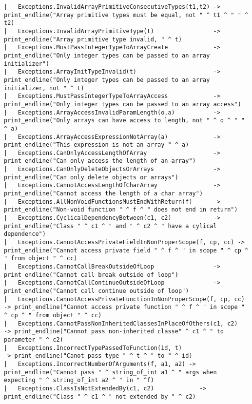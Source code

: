 \begin{verbatim}
| 	Exceptions.InvalidArrayPrimitiveConsecutiveTypes(t1,t2)	-> print_endline("Array primitive types must be equal, not " ^ t1 ^ " " ^ t2)
| 	Exceptions.InvalidArrayPrimitiveType(t) 				-> print_endline("Array primitive type invalid, " ^ t)
| 	Exceptions.MustPassIntegerTypeToArrayCreate				-> print_endline("Only integer types can be passed to an array initializer")
| 	Exceptions.ArrayInitTypeInvalid(t) 						-> print_endline("Only integer types can be passed to an array initializer, not " ^ t)
| 	Exceptions.MustPassIntegerTypeToArrayAccess 			-> print_endline("Only integer types can be passed to an array access")
| 	Exceptions.ArrayAccessInvalidParamLength(o,a) 			-> print_endline("Only arrays can have access to length, not " ^ o ^ " " ^ a)
| 	Exceptions.ArrayAccessExpressionNotArray(a) 			-> print_endline("This expression is not an array " ^ a)
| 	Exceptions.CanOnlyAccessLengthOfArray 					-> print_endline("Can only access the length of an array")
| 	Exceptions.CanOnlyDeleteObjectsOrArrays 				-> print_endline("Can only delete objects or arrays")
| 	Exceptions.CannotAccessLengthOfCharArray 				-> print_endline("Cannot access the length of a char array")
| 	Exceptions.AllNonVoidFunctionsMustEndWithReturn(f) 		-> print_endline("Non-void function " ^ f ^ " does not end in return")
| 	Exceptions.CyclicalDependencyBetween(c1, c2) 			-> print_endline("Class " ^ c1 ^ " and " ^ c2 ^ " have a cylical dependence")
| 	Exceptions.CannotAccessPrivateFieldInNonProperScope(f, cp, cc) -> print_endline("Cannot access private field " ^ f ^ " in scope " ^ cp ^ " from object " ^ cc)
| 	Exceptions.CannotCallBreakOutsideOfLoop 				-> print_endline("Cannot call break outside of loop")
| 	Exceptions.CannotCallContinueOutsideOfLoop				-> print_endline("Cannot call continue outside of loop")
| 	Exceptions.CannotAccessPrivateFunctionInNonProperScope(f, cp, cc) -> print_endline("Cannot access private function " ^ f ^ " in scope " ^ cp ^ " from object " ^ cc)
| 	Exceptions.CannotPassNonInheritedClassesInPlaceOfOthers(c1, c2) 	-> print_endline("Cannot pass non-inherited classe" ^ c1 ^ " to parameter " ^ c2)
| 	Exceptions.IncorrectTypePassedToFunction(id, t) 					-> print_endline("Canot pass type " ^ t ^ " to " ^ id)
| 	Exceptions.IncorrectNumberOfArguments(f, a1, a2) -> print_endline("Cannot pass " ^ string_of_int a1 ^ " args when expecting " ^ string_of_int a2 ^ " in " ^f)
| 	Exceptions.ClassIsNotExtendedBy(c1, c2) 			-> print_endline("Class " ^ c1 ^ " not extended by " ^ c2)


\end{verbatim}

